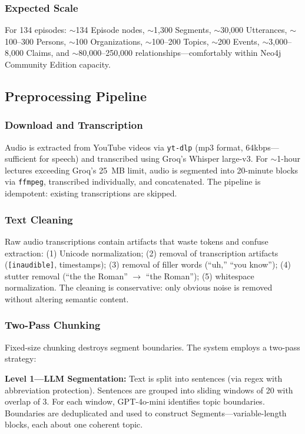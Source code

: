 \subsubsection{Expected Scale}

For 134 episodes: $\sim$134 Episode nodes, $\sim$1,300 Segments, $\sim$30,000 Utterances, $\sim$100--300 Persons, $\sim$100 Organizations, $\sim$100--200 Topics, $\sim$200 Events, $\sim$3,000--8,000 Claims, and $\sim$80,000--250,000 relationships---comfortably within Neo4j Community Edition capacity.

\subsection{Preprocessing Pipeline}

\subsubsection{Download and Transcription}

Audio is extracted from YouTube videos via \texttt{yt-dlp} (mp3 format, 64kbps---sufficient for speech) and transcribed using Groq's Whisper large-v3. For $\sim$1-hour lectures exceeding Groq's 25~MB limit, audio is segmented into 20-minute blocks via \texttt{ffmpeg}, transcribed individually, and concatenated. The pipeline is idempotent: existing transcriptions are skipped.

\subsubsection{Text Cleaning}

Raw audio transcriptions contain artifacts that waste tokens and confuse extraction: (1) Unicode normalization; (2) removal of transcription artifacts (\texttt{[inaudible]}, timestamps); (3) removal of filler words (``uh,'' ``you know''); (4) stutter removal (``the the Roman'' $\rightarrow$ ``the Roman''); (5) whitespace normalization. The cleaning is conservative: only obvious noise is removed without altering semantic content.

\subsubsection{Two-Pass Chunking}

Fixed-size chunking destroys segment boundaries. The system employs a two-pass strategy:

\textbf{Level 1---LLM Segmentation:} Text is split into sentences (via regex with abbreviation protection). Sentences are grouped into sliding windows of 20 with overlap of 3. For each window, GPT-4o-mini identifies topic boundaries. Boundaries are deduplicated and used to construct Segments---variable-length blocks, each about one coherent topic.


